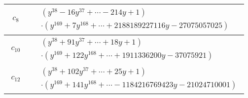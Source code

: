 \documentclass[1p]{elsarticle_modified}
\theoremstyle{definition}
\begin{document}
\begin{tabular}{m{50pt}|m{274pt}}
\hline $$\begin{aligned}c_{8}\end{aligned}$$&$\begin{aligned}
&(y^{38}-16 y^{37}+\cdots-214 y+1)\\
&\cdot(y^{169}+7 y^{168}+\cdots+2188189227116 y-27075057025)
\end{aligned}$\\
\hline $$\begin{aligned}c_{10}\end{aligned}$$&$\begin{aligned}
&(y^{38}+91 y^{37}+\cdots+18 y+1)\\
&\cdot(y^{169}+122 y^{168}+\cdots+1911336200 y-37075921)
\end{aligned}$\\
\hline $$\begin{aligned}c_{12}\end{aligned}$$&$\begin{aligned}
&(y^{38}+102 y^{37}+\cdots+25 y+1)\\
&\cdot(y^{169}+141 y^{168}+\cdots-1184216769423 y-21024710001)
\end{aligned}$\\
\hline
\end{tabular}
\vskip 2pc
\end{document}
